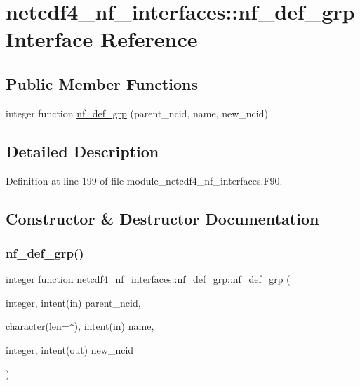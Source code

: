 \hypertarget{interfacenetcdf4__nf__interfaces_1_1nf__def__grp}{}\section{netcdf4\+\_\+nf\+\_\+interfaces\+:\+:nf\+\_\+def\+\_\+grp Interface Reference}
\label{interfacenetcdf4__nf__interfaces_1_1nf__def__grp}
\subsection*{Public Member Functions}
\begin{DoxyCompactItemize}
\item 
integer function \hyperlink{interfacenetcdf4__nf__interfaces_1_1nf__def__grp_aefc8361f34a2fb14b3ab40d82c743338}{nf\+\_\+def\+\_\+grp} (parent\+\_\+ncid, name, new\+\_\+ncid)
\end{DoxyCompactItemize}


\subsection{Detailed Description}


Definition at line 199 of file module\+\_\+netcdf4\+\_\+nf\+\_\+interfaces.\+F90.



\subsection{Constructor \& Destructor Documentation}
\mbox{\label{interfacenetcdf4__nf__interfaces_1_1nf__def__grp_aefc8361f34a2fb14b3ab40d82c743338}} 
\subsubsection{\texorpdfstring{nf\+\_\+def\+\_\+grp()}{nf\_def\_grp()}}
{\footnotesize\ttfamily integer function netcdf4\+\_\+nf\+\_\+interfaces\+::nf\+\_\+def\+\_\+grp\+::nf\+\_\+def\+\_\+grp (\begin{DoxyParamCaption}\item[{integer, intent(in)}]{parent\+\_\+ncid,  }\item[{character(len=$\ast$), intent(in)}]{name,  }\item[{integer, intent(out)}]{new\+\_\+ncid }\end{DoxyParamCaption})}



